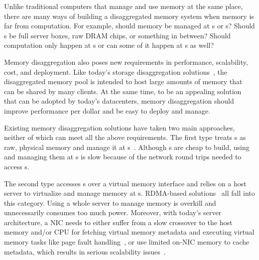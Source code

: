 Unlike traditional computers that manage and use memory at the same place,
there are many ways of building a disaggregated memory system when memory is far from computation.
For example, should memory be managed at \CN{}s or \MN{}s?
Should \MN{}s be full server boxes, raw DRAM chips, or something in between?
Should computation only happen at \CN{}s or can some of it happen at \MN{}s as well?

Memory disaggregation also poses new requirements in performance, scalability, cost, and deployment.
Like today's storage disaggregation solutions~\cite{AMAZON-S3,SnowFlake-NSDI20,Pangu}, 
the disaggregated memory pool is intended to host large amounts of memory
that can be shared by many clients.
At the same time, to be an appealing solution that can be adopted by today's datacenters, 
memory disaggregation should improve performance per dollar and be easy to deploy and manage.

Existing memory disaggregation solutions have taken two main approaches,
neither of which can meet all the above requirements.
The first type treats \MN{}s as raw, physical memory 
and manage it at \CN{}s~\cite{Genz-citation,CXL-citation,Tsai20-ATC}.
Although \MN{}s are cheap to build, using and managing them at \CN{}s
is slow because of the network round trips needed to access \MN{}s.

The second type accesses \MN{}s over a virtual memory interface
and relies on a host server to virtualize and manage memory at \MN{}s. 
RDMA-based solutions~\cite{FaRM,FastSwap,InfiniSwap,StRoM,Kalia14-RDMAKV,Aguilera18-ATC} all fall into this category.
Using a whole server to manage memory is overkill and unnecessarily consumes too much power.
Moreover, with today's server architecture, a NIC needs to either suffer from a slow crossover to the host memory and/or CPU for 
fetching virtual memory metadata and executing virtual memory tasks like page fault handling~\cite{NICPageFaultArchPaper},
or use limited on-NIC memory to cache metadata, which results in serious scalability issues~\cite{FaRM,Tsai17-SOSP}.

